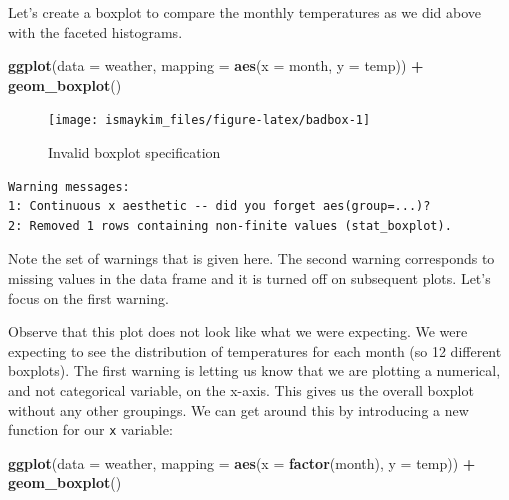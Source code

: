 \documentclass[12pt,]{krantz}
\makeatletter
\newenvironment{Shaded}{\begin{snugshade}}{\end{snugshade}}
\newcommand{\KeywordTok}[1]{\textcolor[rgb]{0.27,0.27,0.27}{\textbf{#1}}}
\newcommand{\DataTypeTok}[1]{\textcolor[rgb]{0.27,0.27,0.27}{#1}}
\newcommand{\StringTok}[1]{\textcolor[rgb]{0.5,0.5,0.5}{#1}}
\newcommand{\OperatorTok}[1]{\textcolor[rgb]{0.43,0.43,0.43}{\textbf{#1}}}
\newcommand{\NormalTok}[1]{#1}
\newenvironment{kframe}{%
\medskip{}
\setlength{\fboxsep}{.8em}
 \def\at@end@of@kframe{}%
 \ifinner\ifhmode%
  \def\at@end@of@kframe{\end{minipage}}%
  \begin{minipage}{\columnwidth}%
 \fi\fi%
 \def\FrameCommand##1{\hskip\@totalleftmargin \hskip-\fboxsep
 \colorbox{shadecolor}{##1}\hskip-\fboxsep
     \hskip-\linewidth \hskip-\@totalleftmargin \hskip\columnwidth}%
 \MakeFramed {\advance\hsize-\width
   \@totalleftmargin\z@ \linewidth\hsize
   \@setminipage}}%
 {\par\unskip\endMakeFramed%
 \at@end@of@kframe}
\renewenvironment{Shaded}{\begin{kframe}}{\end{kframe}}
\theoremstyle{definition}
\theoremstyle{definition}
\theoremstyle{definition}
\theoremstyle{remark}
\makeatother
\begin{document}
Let's create a boxplot to compare the monthly temperatures as we did
above with the faceted histograms.

\begin{Shaded}
\begin{Highlighting}[]
\KeywordTok{ggplot}\NormalTok{(}\DataTypeTok{data =}\NormalTok{ weather, }\DataTypeTok{mapping =} \KeywordTok{aes}\NormalTok{(}\DataTypeTok{x =}\NormalTok{ month, }\DataTypeTok{y =}\NormalTok{ temp)) }\OperatorTok{+}
\StringTok{  }\KeywordTok{geom_boxplot}\NormalTok{()}
\end{Highlighting}
\end{Shaded}

\begin{figure}

{\centering \texttt{[image: ismaykim\_files/figure-latex/badbox-1]} 

}

\caption{Invalid boxplot specification}\label{fig:badbox}
\end{figure}

\begin{verbatim}
Warning messages:
1: Continuous x aesthetic -- did you forget aes(group=...)? 
2: Removed 1 rows containing non-finite values (stat_boxplot). 
\end{verbatim}

Note the set of warnings that is given here. The second warning
corresponds to missing values in the data frame and it is turned off on
subsequent plots. Let's focus on the first warning.

Observe that this plot does not look like what we were expecting. We
were expecting to see the distribution of temperatures for each month
(so 12 different boxplots). The first warning is letting us know that we
are plotting a numerical, and not categorical variable, on the x-axis.
This gives us the overall boxplot without any other groupings. We can
get around this by introducing a new function for our \texttt{x}
variable:

\begin{Shaded}
\begin{Highlighting}[]
\KeywordTok{ggplot}\NormalTok{(}\DataTypeTok{data =}\NormalTok{ weather, }\DataTypeTok{mapping =} \KeywordTok{aes}\NormalTok{(}\DataTypeTok{x =} \KeywordTok{factor}\NormalTok{(month), }\DataTypeTok{y =}\NormalTok{ temp)) }\OperatorTok{+}
\StringTok{  }\KeywordTok{geom_boxplot}\NormalTok{()}
\end{Highlighting}
\end{Shaded}
\end{document}
